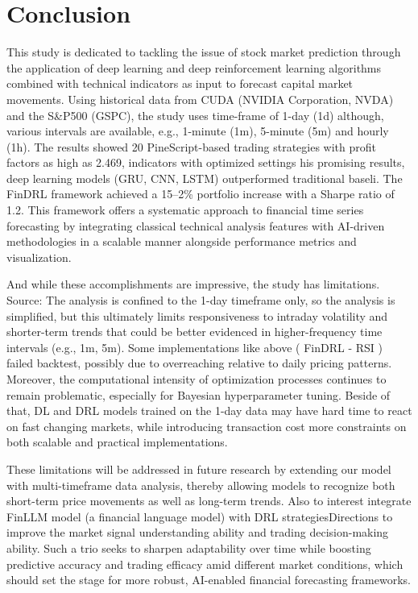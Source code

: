 \chapter{Conclusion}
This study is dedicated to tackling the issue of stock market prediction through the application of deep learning and deep reinforcement learning algorithms combined with technical indicators as input to forecast capital market movements. Using historical data from CUDA (NVIDIA Corporation, NVDA) and the S\&P500 (GSPC), the study uses time-frame of 1-day (1d) although, various intervals are available, e.g., 1-minute (1m), 5-minute (5m) and hourly (1h). The results showed 20 PineScript-based trading strategies with profit factors as high as 2.469, indicators with optimized settings his promising results, deep learning models (GRU, CNN, LSTM) outperformed traditional baseli. The FinDRL framework achieved a 15–2\% portfolio increase with a Sharpe ratio of 1.2. This framework offers a systematic approach to financial time series forecasting by integrating classical technical analysis features with AI-driven methodologies in a scalable manner alongside performance metrics and visualization.

And while these accomplishments are impressive, the study has limitations. Source: The analysis is confined to the 1-day timeframe only, so the analysis is simplified, but this ultimately limits responsiveness to intraday volatility and shorter-term trends that could be better evidenced in higher-frequency time intervals (e.g., 1m, 5m). Some implementations like above ( FinDRL - RSI ) failed backtest, possibly due to overreaching relative to daily pricing patterns. Moreover, the computational intensity of optimization processes continues to remain problematic, especially for Bayesian hyperparameter tuning. Beside of that, DL and DRL models trained on the 1-day data may have hard time to react on fast changing markets, while introducing transaction cost more constraints on both scalable and practical implementations.

These limitations will be addressed in future research by extending our model with multi-timeframe data analysis, thereby allowing models to recognize both short-term price movements as well as long-term trends. Also to interest integrate FinLLM model (a financial language model) with DRL strategiesDirections to improve the market signal understanding ability and trading decision-making ability. Such a trio seeks to sharpen adaptability over time while boosting predictive accuracy and trading efficacy amid different market conditions, which should set the stage for more robust, AI-enabled financial forecasting frameworks.